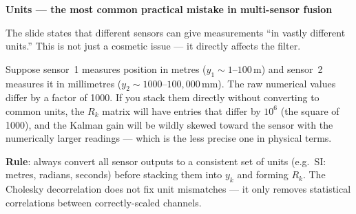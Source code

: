 \documentclass[12pt, a4paper]{article}
\begin{document}
\begin{warnbox}
  \textbf{Units --- the most common practical mistake in multi-sensor fusion}

  The slide states that different sensors can give measurements ``in vastly
  different units.''
  This is not just a cosmetic issue --- it directly affects the filter.

  Suppose sensor~1 measures position in metres ($y_1 \sim 1$--$100$\,m)
  and sensor~2 measures it in millimetres ($y_2 \sim 1000$--$100{,}000$\,mm).
  The raw numerical values differ by a factor of 1000.
  If you stack them directly without converting to common units, the $R_k$
  matrix will have entries that differ by $10^6$ (the square of 1000),
  and the Kalman gain will be wildly skewed toward the sensor with the
  numerically larger readings --- which is the less precise one in physical
  terms.

  \textbf{Rule}: always convert all sensor outputs to a consistent set of
  units (e.g.\ SI: metres, radians, seconds) before stacking them into $y_k$
  and forming $R_k$.
  The Cholesky decorrelation does not fix unit mismatches --- it only removes
  statistical correlations between correctly-scaled channels.
\end{warnbox}
\end{document}
